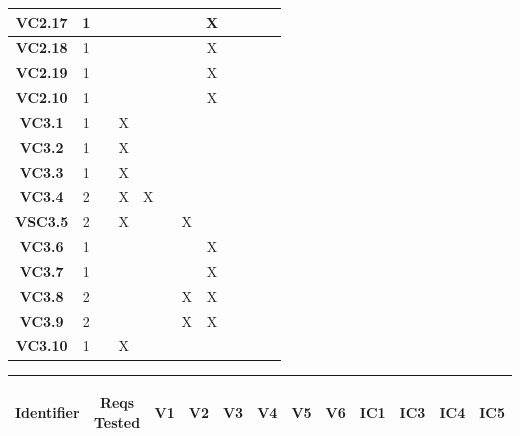 \documentclass [10pt]{article}
\begin{document}
\begin{center}
\begin{tabularx} {.85\textwidth} {|c|c|c|c|c|c|c|c|c|c|c|c|}
\textbf{VC2.17}&1& & & & & & X & & & &     \\ \hline
\textbf{VC2.18}&1& & & & & & X & & & &     \\ \hline
\textbf{VC2.19}&1& & & & & & X & & & &    \\ \hline
\textbf{VC2.10}&1& & & & & & X & & & &     \\ \hline
\textbf{VC3.1}&1& &X & & & &  & & & &     \\ \hline
\textbf{VC3.2}&1& &X & & & &  & & & &     \\ \hline
\textbf{VC3.3}&1& &X & & & &  & & & &     \\ \hline
\textbf{VC3.4}&2& &X & X& & &  & & & &     \\ \hline
 \textbf{VSC3.5} &2& &X & & &X &  & & & &     \\ \hline
 \textbf{VC3.6}  &1& & & & & & X & & & &     \\ \hline
 \textbf{VC3.7}  &1& & & & & & X & & & &     \\ \hline
 \textbf{VC3.8}  &2& & & & &X & X & & & &     \\ \hline
 \textbf{VC3.9}  &2& & & & &X & X & & & &     \\ \hline
 \textbf{VC3.10} &1& & X& & & &  & & & &     \\ \hline

\end{tabularx}


\begin{tabularx} {.88\textwidth} {|c|c|c|c|c|c|c|c|c|c|c|c|} \hline
  \hspace {1.9mm} \textbf{Identifier \hspace {1.9mm} } & \begin{minipage} {.075\columnwidth} \vspace{1mm} \begin {center}\textbf{Reqs Tested}\vspace{1mm}\end{center}\end{minipage}
 & \textbf{V1} &\textbf{V2} &\textbf{V3} &\textbf{V4} &\textbf{V5} &\textbf{V6} &\textbf{IC1}  &\textbf{IC3} &\textbf{IC4}&\textbf{IC5}  \\ \hline



\end{tabularx}
\end{center}
\end{document}
